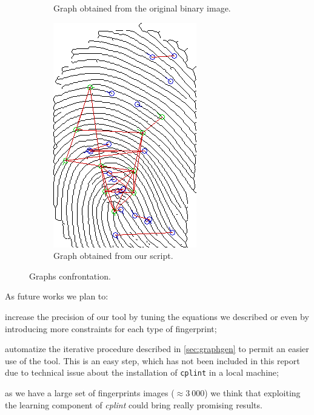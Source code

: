 \documentclass[8pt]{article}
\begin{document}
\begin{figure}
\begin{subfigure}{.48\textwidth}
		\caption{Graph obtained from the original binary image.}
					\label{fig:concl-c}
	\end{subfigure}%
	\hfill
	\begin{subfigure}{.48\textwidth}
		\centering
		\includegraphics[width=0.86\linewidth]{img/plp-final}
		\caption{Graph obtained from our script.}
			\label{fig:concl-plp}
	\end{subfigure}%
	\caption{Graphs confrontation.}
	\label{fig:concl}
\end{figure}

As future works we plan to:
\begin{enumerate*}[label=\roman*)]
  \item increase the precision of our tool by tuning the equations we described
        or even by introducing more constraints for each type of fingerprint;
  \item automatize the iterative procedure described in
        \cref{sec:graphgen} to permit an easier use of the tool.  This is an
        easy step, which has not been included in this report due to technical
        issue about the installation of \texttt{cplint} in a local machine;
	\item as we have a large set of fingerprints images ($\approx 3\ 000$) we think that 
        exploiting the learning component of \textit{cplint} could bring really promising results.
\end{enumerate*}





\end{document}
